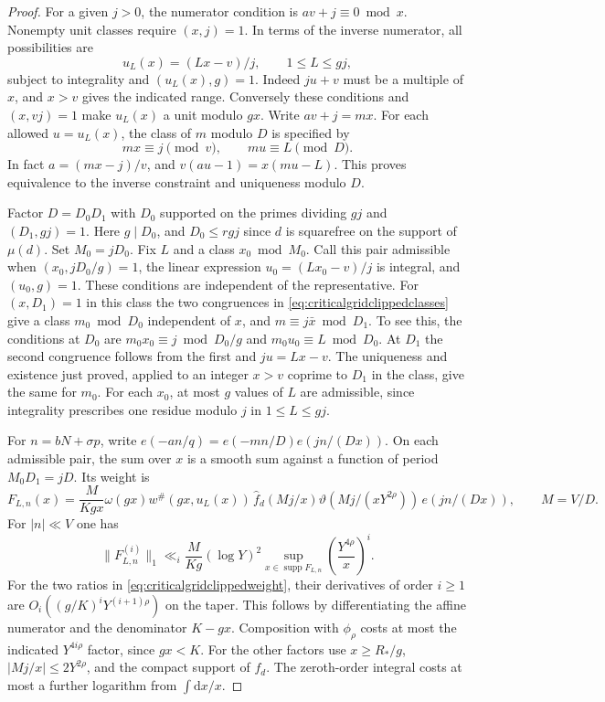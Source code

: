 \documentclass[11pt,a4paper]{article}
\numberwithin{equation}{section}
\newcommand{\ud}{\mathrm d}
\begin{document}
\begin{proof}
For a given $j>0$, the numerator condition is
$av+j\equiv0\bmod x$. Nonempty unit classes require
$(x,j)=1$. In terms of the inverse numerator, all
possibilities are
\begin{equation}
 u_L(x)=(Lx-v)/j,\qquad 1\le L\le g j ,
 \label{eq:criticalgridclippedbranches}
\end{equation}
subject to integrality and $(u_L(x),g)=1$.
Indeed $j u+v$ must be a multiple of $x$, and $x>v$
gives the indicated range. Conversely these conditions
and $(x,vj)=1$ make $u_L(x)$ a unit modulo $gx$.
Write $av+j=m x$. For each allowed $u=u_L(x)$,
the class of $m$ modulo $D$ is specified by
\begin{equation}
 m x\equiv j\pmod v,\qquad m u\equiv L\pmod D .
 \label{eq:criticalgridclippedclasses}
\end{equation}
In fact $a=(mx-j)/v$, and $v(au-1)=x(mu-L)$.
This proves equivalence to the inverse constraint
and uniqueness modulo $D$.

Factor $D=D_0D_1$ with $D_0$ supported on the primes
dividing $g j$ and $(D_1,g j)=1$. Here $g\mid D_0$,
and $D_0\le r g j$ since $d$ is squarefree on the
support of $\mu(d)$. Set $M_0=jD_0$.
Fix $L$ and a class $x_0\bmod M_0$. Call this pair
admissible when $(x_0,jD_0/g)=1$, the linear
expression $u_0=(Lx_0-v)/j$ is integral, and $(u_0,g)=1$.
These conditions are independent of the representative.
For $(x,D_1)=1$ in this class the two congruences in
\cref{eq:criticalgridclippedclasses} give
a class $m_0\bmod D_0$ independent of $x$, and
$m\equiv j\bar x\bmod D_1$. To see this, the conditions
at $D_0$ are $m_0 x_0\equiv j\bmod D_0/g$ and
$m_0u_0\equiv L\bmod D_0$. At $D_1$ the second
congruence follows from the first and $j u=Lx-v$.
The uniqueness and existence just proved, applied to
an integer $x>v$ coprime to $D_1$ in the class,
give the same for $m_0$. For each $x_0$, at most
$g$ values of $L$ are admissible, since integrality
prescribes one residue modulo $j$ in $1\le L\le gj$.

For $n=bN+\sigma p$, write
$e(-an/q)=e(-mn/D)e(jn/(Dx))$.
On each admissible pair, the sum over $x$ is a smooth
sum against a function of period $M_0D_1=jD$.
Its weight is
\[
 F_{L,n}(x)=\frac{M}{K g x}\omega(gx)
    w^\#(gx,u_L(x))\,\widehat f_d(Mj/x)
    \vartheta(Mj/(xY^{2\rho}))\,e(jn/(Dx)),
 \qquad M=V/D.
\]
For $|n|\ll V$ one has
\[
 \|F_{L,n}^{(i)}\|_1\ll_i
     \frac{M}{Kg}(\log Y)^2
        \sup_{x\in\operatorname{supp}F_{L,n}}
             \left(\frac{Y^{4\rho}}{x}\right)^i .
\]
For the two ratios in \cref{eq:criticalgridclippedweight},
their derivatives of order $i\ge1$ are
$O_i((g/K)^iY^{(i+1)\rho})$ on the taper.
This follows by differentiating the affine numerator
and the denominator $K-gx$. Composition with $\phi_\rho$
costs at most the indicated $Y^{4i\rho}$ factor, since $gx<K$.
For the other factors use $x\ge R_*/g$,
$|Mj/x|\le 2Y^{2\rho}$, and the compact support of $f_d$.
The zeroth-order integral costs at most a further
logarithm from $\int \ud x/x$.


\end{proof}
\end{document}
